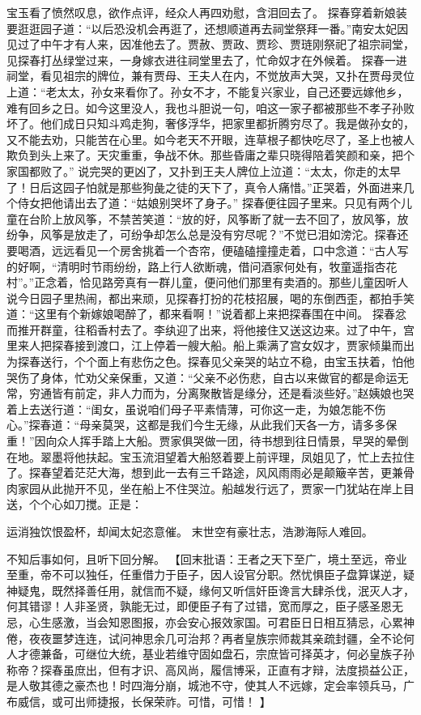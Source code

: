 \documentclass[12pt,oneside]{book}
\begin{document}
宝玉看了愤然叹息，欲作点评，经众人再四劝慰，含泪回去了。
探春穿着新娘装要逛逛园子道：“以后恐没机会再逛了，还想顺道再去祠堂祭拜一番。”南安太妃因见过了中午才有人来，因准他去了。贾赦、贾政、贾珍、贾琏刚祭祀了祖宗祠堂，见探春打丛绿堂过来，一身嫁衣进往祠堂里去了，忙命奴才在外候着。
探春一进祠堂，看见祖宗的牌位，兼有贾母、王夫人在内，不觉放声大哭，又扑在贾母灵位上道：“老太太，孙女来看你了。孙女不才，不能复兴家业，自己还要远嫁他乡，难有回乡之日。如今这里没人，我也斗胆说一句，咱这一家子都被那些不孝子孙败坏了。他们成日只知斗鸡走狗，奢侈浮华，把家里都折腾穷尽了。我是做孙女的，又不能去劝，只能苦在心里。如今老天不开眼，连草根子都快吃尽了，圣上也被人欺负到头上来了。天灾重重，争战不休。那些昏庸之辈只晓得陪着笑颜和亲，把个家国都败了。”
说完哭的更凶了，又扑到王夫人牌位上泣道：“太太，你走的太早了！日后这园子怕就是那些狗彘之徒的天下了，真令人痛惜。”正哭着，外面进来几个侍女把他请出去了道：“姑娘别哭坏了身子。”
探春便往园子里来。只见有两个儿童在台阶上放风筝，不禁苦笑道：“放的好，风筝断了就一去不回了，放风筝，放纷争，风筝是放走了，可纷争却怎么总是没有穷尽呢？”不觉已泪如滂沱。探春还要喝酒，远远看见一个房舍挑着一个杏帘，便磕磕撞撞走着，口中念道：“古人写的好啊，“清明时节雨纷纷，路上行人欲断魂，借问酒家何处有，牧童遥指杏花村”。”正念着，恰见路旁真有一群儿童，便问他们那里有卖酒的。那些儿童因听人说今日园子里热闹，都出来顽，见探春打扮的花枝招展，喝的东倒西歪，都拍手笑道：“这里有个新嫁娘喝醉了，都来看啊！”说着都上来把探春围在中间。
探春忿而推开群童，往稻香村去了。李纨迎了出来，将他接住又送这边来。过了中午，宫里来人把探春接到渡口，江上停着一艘大船。船上乘满了宫女奴才，贾家倾巢而出为探春送行，个个面上有悲伤之色。探春见父亲哭的站立不稳，由宝玉扶着，怕他哭伤了身体，忙劝父亲保重，又道：“父亲不必伤悲，自古以来做官的都是命运无常，穷通皆有前定，非人力而为，分离聚散皆是缘分，还是看淡些好。”赵姨娘也哭着上去送行道：“闺女，虽说咱们母子平素情薄，可你这一走，为娘怎能不伤心。”探春道：“母亲莫哭，这都是我们今生无缘，从此我们天各一方，请多多保重！”因向众人挥手踏上大船。贾家俱哭做一团，待书想到往日情景，早哭的晕倒在地。翠墨将他扶起。宝玉流泪望着大船怒着要上前评理，凤姐见了，忙上去拉住了。探春望着茫茫大海，想到此一去有三千路途，风风雨雨必是颠簸辛苦，更兼骨肉家园从此抛开不见，坐在船上不住哭泣。船越发行远了，贾家一门犹站在岸上目送，个个心如刀搅。正是：

运消独饮恨盈杯，却闻太妃恣意催。
末世空有豪壮志，浩渺海际人难回。

不知后事如何，且听下回分解。
【回末批语：王者之天下至广，境土至远，帝业至重，帝不可以独任，任重借力于臣子，因人设官分职。然忧惧臣子盘算谋逆，疑神疑鬼，既然择善任用，就信而不疑，缘何又听信奸臣谗言大肆杀伐，泯灭人才，何其错谬！人非圣贤，孰能无过，即便臣子有了过错，宽而厚之，臣子感圣恩无忌，心生感激，当会知恩图报，亦会安心报效家国。可君臣日日相互猜忌，心累神倦，夜夜噩梦连连，试问神思余几可治邦？再者皇族宗师裁其亲疏封疆，全不论何人才德兼备，可继位大统，基业若维守固如盘石，宗庶皆可择英才，何必皇族子孙称帝？探春虽庶出，但有才识、高风尚，履信博采，正直有才辩，法度损益公正，是人敬其德之豪杰也！时四海分崩，城池不守，使其人不远嫁，定会率领兵马，广布威信，或可出师捷报，长保荣祚。可惜，可惜！ 】
\end{document}
